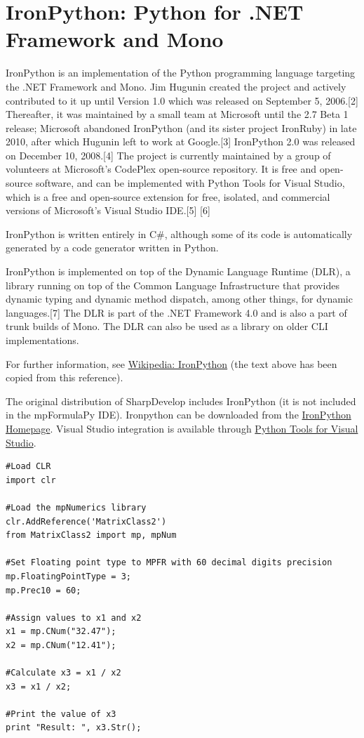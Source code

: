 \newpage
\section{IronPython: Python for .NET Framework and Mono}


IronPython is an implementation of the Python programming language targeting the .NET Framework and Mono. Jim Hugunin created the project and actively contributed to it up until Version 1.0 which was released on September 5, 2006.[2] Thereafter, it was maintained by a small team at Microsoft until the 2.7 Beta 1 release; Microsoft abandoned IronPython (and its sister project IronRuby) in late 2010, after which Hugunin left to work at Google.[3] IronPython 2.0 was released on December 10, 2008.[4] The project is currently maintained by a group of volunteers at Microsoft's CodePlex open-source repository. It is free and open-source software, and can be implemented with Python Tools for Visual Studio, which is a free and open-source extension for free, isolated, and commercial versions of Microsoft's Visual Studio IDE.[5] [6]

IronPython is written entirely in C\#, although some of its code is automatically generated by a code generator written in Python.

IronPython is implemented on top of the Dynamic Language Runtime (DLR), a library running on top of the Common Language Infrastructure that provides dynamic typing and dynamic method dispatch, among other things, for dynamic languages.[7] The DLR is part of the .NET Framework 4.0 and is also a part of trunk builds of Mono. The DLR can also be used as a library on older CLI implementations.

For further information, see \href{http://en.wikipedia.org/wiki/IronPython}{Wikipedia: IronPython} (the text above has been copied from this reference).

The original distribution of SharpDevelop includes IronPython (it is not included in the mpFormulaPy IDE). Ironpython can be downloaded from the 
\href{http://ironpython.net/}{IronPython Homepage}. Visual Studio integration is available through  \href{http://ironpython.net/tools/}{Python Tools for Visual Studio}.


\begin{lstlisting}
#Load CLR
import clr

#Load the mpNumerics library
clr.AddReference('MatrixClass2')
from MatrixClass2 import mp, mpNum

#Set Floating point type to MPFR with 60 decimal digits precision
mp.FloatingPointType = 3;
mp.Prec10 = 60;

#Assign values to x1 and x2
x1 = mp.CNum("32.47");
x2 = mp.CNum("12.41");

#Calculate x3 = x1 / x2
x3 = x1 / x2;

#Print the value of x3
print "Result: ", x3.Str();
\end{lstlisting}





